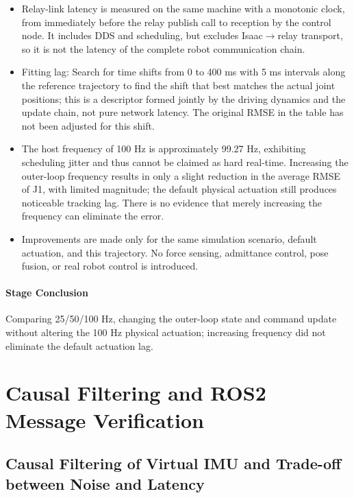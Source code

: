 \begin{itemize}
\tightlist
\item
  Relay-link latency is measured on the same machine with a monotonic clock, from immediately before the relay publish call to reception by the control node. It includes DDS and scheduling, but excludes Isaac\(\rightarrow\)relay transport, so it is not the latency of the complete robot communication chain.
\item
  Fitting lag: Search for time shifts from 0 to 400 ms with 5 ms intervals along the reference trajectory to find the shift that best matches the actual joint positions; this is a descriptor formed jointly by the driving dynamics and the update chain, not pure network latency. The original RMSE in the table has not been adjusted for this shift.
\item
  The host frequency of 100 Hz is approximately 99.27 Hz, exhibiting scheduling jitter and thus cannot be claimed as hard real-time. Increasing the outer-loop frequency results in only a slight reduction in the average RMSE of J1, with limited magnitude; the default physical actuation still produces noticeable tracking lag. There is no evidence that merely increasing the frequency can eliminate the error.
\item
  Improvements are made only for the same simulation scenario, default actuation, and this trajectory. No force sensing, admittance control, pose fusion, or real robot control is introduced.
\end{itemize}


\paragraph{Stage Conclusion} Comparing 25/50/100 Hz, changing the outer-loop state and command update without altering the 100 Hz physical actuation; increasing frequency did not eliminate the default actuation lag.


\FloatBarrier

\section{Causal Filtering and ROS2 Message Verification}

\label{stage:s06}

\subsection{Causal Filtering of Virtual IMU and Trade-off between Noise and Latency}\label{s06-detail-1}

